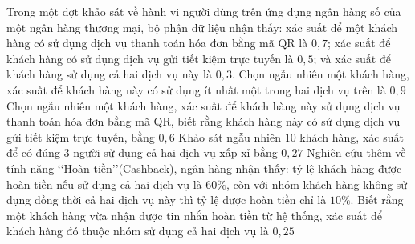\begin{ex}%
	Trong một đợt khảo sát về hành vi người dùng trên ứng dụng ngân hàng số của một ngân hàng thương mại, bộ phận dữ liệu nhận thấy: xác suất để một khách hàng có sử dụng dịch vụ thanh toán hóa đơn bằng mã QR là $0{,}7$; xác suất để khách hàng có sử dụng dịch vụ gửi tiết kiệm trực tuyến là $0{,}5$; và xác suất để khách hàng sử dụng cả hai dịch vụ này là $0{,}3$.
	\choiceTF
	{\True Chọn ngẫu nhiên một khách hàng, xác suất để khách hàng này có sử dụng ít nhất một trong hai dịch vụ trên là $0{,}9$}
	{\True Chọn ngẫu nhiên một khách hàng, xác suất để khách hàng này sử dụng dịch vụ thanh toán hóa đơn bằng mã QR, biết rằng khách hàng này có sử dụng dịch vụ gửi tiết kiệm trực tuyến, bằng $0{,}6$}
	{\True Khảo sát ngẫu nhiên $10$ khách hàng, xác suất để có đúng $3$ người sử dụng cả hai dịch vụ xấp xỉ bằng $0{,}27$}
	{Nghiên cứu thêm về tính năng \lq\lq Hoàn tiền\rq\rq (Cashback), ngân hàng nhận thấy: tỷ lệ khách hàng được hoàn tiền nếu sử dụng cả hai dịch vụ là $60\%$, còn với nhóm khách hàng không sử dụng đồng thời cả hai dịch vụ này thì tỷ lệ được hoàn tiền chỉ là $10\%$. Biết rằng một khách hàng vừa nhận được tin nhắn hoàn tiền từ hệ thống, xác suất để khách hàng đó thuộc nhóm sử dụng cả hai dịch vụ là $0{,}25$}
\end{ex}
